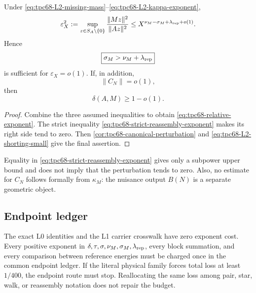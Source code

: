 \begin{proposition}
\label{prop:tpc68-strict-exponent-gate}
Under
\eqref{eq:tpc68-L2-missing-mass}--\eqref{eq:tpc68-L2-kappa-exponent},
\begin{equation}
 \varepsilon_X^2
 :=
 \sup_{z\in S_A\setminus\{0\}}
 \frac{\|Mz\|^2}{\|Az\|^2}
 \le
 X^{\nu_M-\sigma_M+\lambda_{\rm rep}+o(1)}.
 \label{eq:tpc68-relative-exponent}
\end{equation}
Hence
\begin{equation}
 \boxed{\sigma_M>\nu_M+\lambda_{\rm rep}}
 \label{eq:tpc68-strict-reassembly-exponent}
\end{equation}
is sufficient for \(\varepsilon_X=o(1)\).  If, in addition,
\begin{equation}
 \|C_N\|=o(1),
 \label{eq:tpc68-L2-shorting-small}
\end{equation}
then
\[
 \delta(A,M)\ge1-o(1).
\]
\end{proposition}

\begin{proof}
Combine the three assumed inequalities to obtain
\eqref{eq:tpc68-relative-exponent}.  The strict inequality
\eqref{eq:tpc68-strict-reassembly-exponent} makes its right side tend to
zero.  Then \cref{cor:tpc68-canonical-perturbation} and
\eqref{eq:tpc68-L2-shorting-small} give the final assertion.
\end{proof}

Equality in \eqref{eq:tpc68-strict-reassembly-exponent} gives only a
subpower upper bound and does not imply that the perturbation tends to
zero.  Also, no estimate for \(C_N\) follows formally from
\(\kappa_M\): the nuisance output \(B(N)\) is a separate geometric object.

\subsection{Endpoint ledger}

The exact L0 identities and the L1 carrier crosswalk have zero exponent
cost.  Every positive exponent in
\(\delta,\tau,\sigma,\nu_M,\sigma_M,\lambda_{\rm rep}\), every block
summation, and every comparison between reference energies must be charged
once in the common endpoint ledger.  If the literal physical family forces
total loss at least \(1/400\), the endpoint route must stop.  Reallocating
the same loss among pair, star, walk, or reassembly notation does not repair
the budget.
